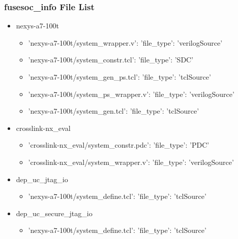 \subsubsection{fusesoc\_info File List}
\begin{itemize}
\item nexys-a7-100t
	\begin{itemize}
	\item {'nexys-a7-100t/system\_wrapper.v': {'file\_type': 'verilogSource'}}
	\item {'nexys-a7-100t/system\_constr.tcl': {'file\_type': 'SDC'}}
	\item {'nexys-a7-100t/system\_gen\_ps.tcl': {'file\_type': 'tclSource'}}
	\item {'nexys-a7-100t/system\_ps\_wrapper.v': {'file\_type': 'verilogSource'}}
	\item {'nexys-a7-100t/system\_gen.tcl': {'file\_type': 'tclSource'}}
	\end{itemize}
\item crosslink-nx\_eval
	\begin{itemize}
	\item {'crosslink-nx\_eval/system\_constr.pdc': {'file\_type': 'PDC'}}
	\item {'crosslink-nx\_eval/system\_wrapper.v': {'file\_type': 'verilogSource'}}
	\end{itemize}
\item dep\_uc\_jtag\_io
	\begin{itemize}
	\item {'nexys-a7-100t/system\_define.tcl': {'file\_type': 'tclSource'}}
	\end{itemize}
\item dep\_uc\_secure\_jtag\_io
	\begin{itemize}
	\item {'nexys-a7-100t/system\_define.tcl': {'file\_type': 'tclSource'}}
	\end{itemize}
\end{itemize}
